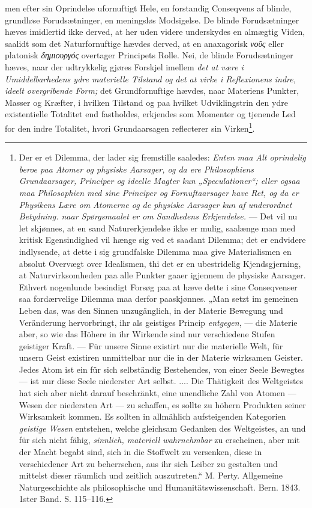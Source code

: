 \documentclass[12pt,a4paper]{book}
\begin{document}
\setcounter{footnote}{0}
men efter sin Oprindelse ufornuftigt Hele, en forstandig Conseqvens af
blinde, grundløse Forudsætninger, en meningsløs Modsigelse. De blinde
Forudsætninger hæves imidlertid ikke derved, at her uden videre
underskydes en almægtig Viden, saalidt som det Naturfornuftige hævdes
derved, at en anaxagorisk \textit{νοῦς} eller platonisk
\textit{δημιουργός} overtager Principets Rolle. Nei, de blinde
Forudsætninger hæves, naar der udtrykkelig gjøres Forskjel imellem
\emph{det at være i Umiddelbarhedens ydre materielle Tilstand og det at
virke i Reflexionens indre, ideelt overgribende Form;} det
Grundfornuftige
hævdes, naar Materiens Punkter, Masser og Kræfter, i hvilken Tilstand
og paa hvilket Udviklingstrin den ydre existentielle Totalitet end
fastholdes, erkjendes som Momenter og tjenende Led for den indre
Totalitet, hvori Grundaarsagen reflecterer sin
Virken\footnote{Der er et Dilemma, der lader sig fremstille saaledes:
\emph{Enten maa Alt oprindelig beroe paa Atomer og physiske Aarsager, og
da ere Philosophiens Grundaarsager, Principer og ideelle Magter kun
„Speculationer“; eller ogsaa maa Philosophien med sine Principer og
Fornuftaarsager have Ret, og da er Physikens Lære om Atomerne og de
physiske Aarsager kun af underordnet Betydning. naar Spørgsmaalet er om
Sandhedens Erkjendelse.} --- Det vil nu let skjønnes, at en sand
Naturerkjendelse ikke er mulig, saalænge man med kritisk
Egensindighed vil hænge sig ved et saadant Dilemma; det er endvidere
indlysende, at dette i sig grundfalske Dilemma maa give Materialismen
en absolut Overvægt over Idealismen, thi det er en ubestridelig
Kjendsgjerning, at Naturvirksomheden paa alle Punkter gaaer igjennem de
physiske Aarsager. Ethvert nogenlunde besindigt Forsøg paa at hæve
dette i sine Conseqvenser saa fordærvelige Dilemma maa derfor
paaskjønnes. „Man setzt im gemeinen Leben das, was den Sinnen
unzugänglich, in der Materie Bewegung und Veränderung hervorbringt,
ihr als geistiges Princip \emph{entgegen}, --- die Materie aber, so wie
das Höhere in ihr Wirkende sind nur verschiedene Stufen geistiger Kraft.
--- Für unsere Sinne existirt nur die materielle Welt, für unsern
Geist existiren unmittelbar nur die in der Materie wirksamen Geister.
Jedes Atom ist ein für sich selbständig Bestehendes, von einer Seele
Bewegtes --- ist nur diese Seele niederster Art selbst. .... Die
Thätigkeit des Weltgeistes hat sich aber nicht darauf beschränkt, eine
unendliche Zahl von Atomen --- Wesen der niedersten Art --- zu
schaffen, es sollte zu höhern Produkten seiner Wirksamkeit kommen. Es
sollten in allmählich aufsteigenden Kategorien \emph{geistige Wesen}
entstehen, welche gleichsam Gedanken des Weltgeistes, an und für sich
nicht fähig, \emph{sinnlich, materiell wahrnehmbar} zu erscheinen, aber
mit der Macht begabt sind, sich in die Stoffwelt zu versenken, diese in
verschiedener Art zu beherrschen, aus ihr sich Leiber zu gestalten und
mittelst dieser räumlich und zeitlich auszutreten.“ M. Perty.
Allgemeine Naturgeschichte als philosophische und
Humanitätswissenschaft. Bern. 1843. 1ster Band. S. 115--116.}.
\end{document}
